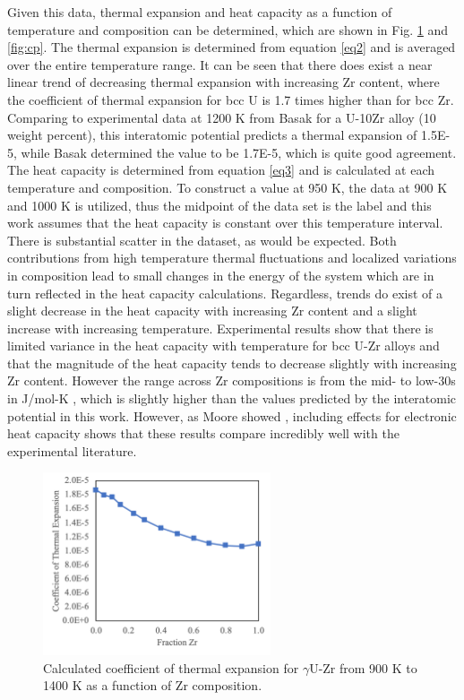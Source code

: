 \documentclass[review]{elsarticle}
\begin{document}
Given this data, thermal expansion and heat capacity as a function of temperature and composition can be determined, which are shown in Fig. \ref{fig:Texp} and \ref{fig:cp}. The thermal expansion is determined from equation \ref{eq2} and is averaged over the entire temperature range. It can be seen that there does exist a near linear trend of decreasing thermal expansion with increasing Zr content, where the coefficient of thermal expansion for bcc U is 1.7 times higher than for bcc Zr. Comparing to experimental data at 1200 K from Basak \cite{basak2009} for a U-10Zr alloy (10 weight percent), this interatomic potential predicts a thermal expansion of 1.5E-5, while Basak determined the value to be 1.7E-5, which is quite good agreement. The heat capacity is determined from equation \ref{eq3} and is calculated at each temperature and composition. To construct a value at 950 K, the data at 900 K and 1000 K is utilized, thus the midpoint of the data set is the label and this work assumes that the heat capacity is constant over this temperature interval. There is substantial scatter in the dataset, as would be expected. Both contributions from high temperature thermal fluctuations and localized variations in composition lead to small changes in the energy of the system which are in turn reflected in the heat capacity calculations. Regardless, trends do exist of a slight decrease in the heat capacity with increasing Zr content and a slight increase with increasing temperature. Experimental results show that there is limited variance in the heat capacity with temperature for bcc U-Zr alloys and that the magnitude of the heat capacity tends to decrease slightly with increasing Zr content. However the range across Zr compositions is from the mid- to low-30s in J/mol-K \cite{janney2018}, which is slightly higher than the values predicted by the interatomic potential in this work. However, as Moore showed \cite{moore2015}, including effects for electronic heat capacity shows that these results compare incredibly well with the experimental literature. 

\begin{figure}[!htp]
\begin{center}
\includegraphics[width=0.6\textwidth]{Texp}
\end{center}
\caption{Calculated coefficient of thermal expansion for $\gamma$U-Zr from 900 K to 1400 K as a function of Zr composition.  }
\label{fig:Texp}
\end{figure}
\end{document}
